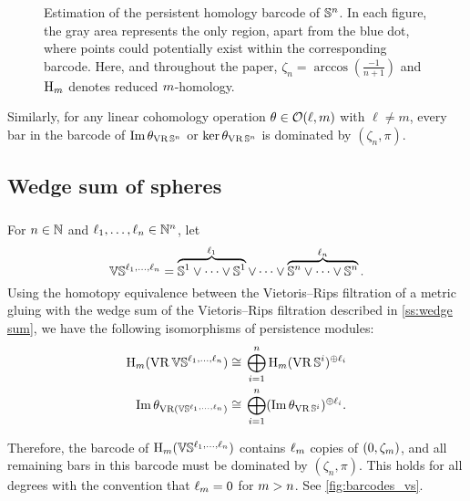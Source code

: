 \begin{figure}[ht]
	\centering
	
	\caption{Estimation of the persistent homology barcode of $\mathbb{S}^n$.
		In each figure, the gray area represents the only region, apart from the blue dot, where points could potentially exist within the corresponding barcode.
		Here, and throughout the paper, $\zeta_n = \arccos(\tfrac{-1}{n+1})$ and $\mathrm{H}_m $ denotes reduced $m$-homology. 
        }
	\label{fig:Sk}
\end{figure}

Similarly, for any linear cohomology operation $\theta \in \mathcal{O}(\ell,m)$ with $\ell \neq m$, every bar in the barcode of $\operatorname{Im}\theta_{\operatorname{VR}\mathbb{S}^n}$ or $\ker\theta_{\operatorname{VR}\mathbb{S}^n}$ is dominated by $(\zeta_n,\pi)$.

\subsection{Wedge sum of spheres}

\subsubsection{}

For $n \in \mathbb{N}$ and $\ell_1, \dots, \ell_n \in \mathbb{N}^n$, let
\[
\mathbb{V}\mathbb{S}^{\ell_1,\dots,\ell_n} = 
\overbrace{\mathbb{S}^1\vee\dots\vee\mathbb{S}^1}^{\ell_1} \vee\dots\vee \overbrace{\mathbb{S}^n\vee\dots\vee\mathbb{S}^n}^{\ell_n}.
\]
Using the homotopy equivalence between the Vietoris--Rips filtration of a metric gluing with the wedge sum of the Vietoris--Rips filtration described in \cref{ss:wedge sum}, we have the following isomorphisms of persistence modules:
\begin{align*}
        \mathrm{H}_m (\operatorname{VR}\mathbb{V}\mathbb{S}^{\ell_1,\dots,\ell_n}) & \cong \, \bigoplus_{i=1}^n \mathrm{H}_m (\operatorname{VR}\mathbb{S}^i)^{\oplus \ell_i}\\
	\operatorname{Im}\theta_{\operatorname{VR}(\mathbb{V}\mathbb{S}^{\ell_1,\dots,\ell_n})} &\cong \, \bigoplus_{i=1}^n (\operatorname{Im}\theta_{\operatorname{VR}\mathbb{S}^i})^{\oplus \ell_i}.
\end{align*}


Therefore, the barcode of $\mathrm{H}_m(\mathbb{V}\mathbb{S}^{\ell_1,\dots,\ell_n})$ contains $\ell_m$ copies of $(0,\zeta_m)$, and all remaining bars in this barcode must be dominated by $(\zeta_n,\pi)$.
This holds for all degrees with the convention that $\ell_m = 0$ for $m > n$.
See \cref{fig:barcodes_vs}.

